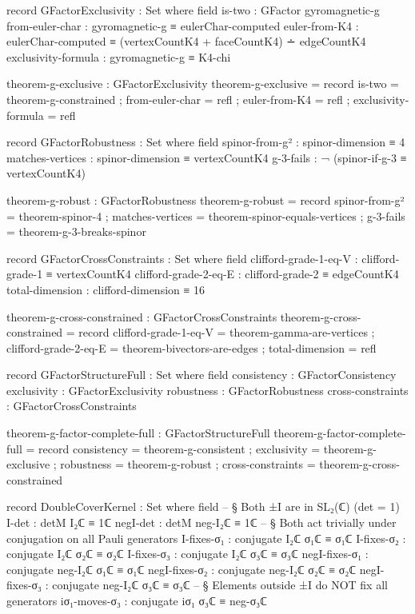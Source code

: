 \documentclass[11pt,a4paper]{book}
\begin{document}
\begin{code}
record GFactorExclusivity : Set where
  field
    is-two              : GFactor gyromagnetic-g
    from-euler-char     : gyromagnetic-g ≡ eulerChar-computed
    euler-from-K4       : eulerChar-computed ≡ (vertexCountK4 + faceCountK4) ∸ edgeCountK4
    exclusivity-formula : gyromagnetic-g ≡ K4-chi

theorem-g-exclusive : GFactorExclusivity
theorem-g-exclusive = record
  { is-two = theorem-g-constrained
  ; from-euler-char = refl
  ; euler-from-K4 = refl
  ; exclusivity-formula = refl
  }

record GFactorRobustness : Set where
  field
    spinor-from-g²   : spinor-dimension ≡ 4
    matches-vertices : spinor-dimension ≡ vertexCountK4
    g-3-fails        : ¬ (spinor-if-g-3 ≡ vertexCountK4)

theorem-g-robust : GFactorRobustness
theorem-g-robust = record
  { spinor-from-g² = theorem-spinor-4
  ; matches-vertices = theorem-spinor-equals-vertices
  ; g-3-fails = theorem-g-3-breaks-spinor
  }

record GFactorCrossConstraints : Set where
  field
    clifford-grade-1-eq-V : clifford-grade-1 ≡ vertexCountK4
    clifford-grade-2-eq-E : clifford-grade-2 ≡ edgeCountK4
    total-dimension       : clifford-dimension ≡ 16

theorem-g-cross-constrained : GFactorCrossConstraints
theorem-g-cross-constrained = record
  { clifford-grade-1-eq-V = theorem-gamma-are-vertices
  ; clifford-grade-2-eq-E = theorem-bivectors-are-edges
  ; total-dimension = refl
  }

record GFactorStructureFull : Set where
  field
    consistency      : GFactorConsistency
    exclusivity      : GFactorExclusivity
    robustness       : GFactorRobustness
    cross-constraints : GFactorCrossConstraints

theorem-g-factor-complete-full : GFactorStructureFull
theorem-g-factor-complete-full = record
  { consistency = theorem-g-consistent
  ; exclusivity = theorem-g-exclusive
  ; robustness = theorem-g-robust
  ; cross-constraints = theorem-g-cross-constrained
  }

record DoubleCoverKernel : Set where
  field
    -- § Both ±I are in SL₂(ℂ) (det = 1)
    I-det    : detM I₂ℂ     ≡ 1ℂ
    negI-det : detM neg-I₂ℂ ≡ 1ℂ
    -- § Both act trivially under conjugation on all Pauli generators
    I-fixes-σ₁    : conjugate I₂ℂ     σ₁ℂ ≡ σ₁ℂ
    I-fixes-σ₂    : conjugate I₂ℂ     σ₂ℂ ≡ σ₂ℂ
    I-fixes-σ₃    : conjugate I₂ℂ     σ₃ℂ ≡ σ₃ℂ
    negI-fixes-σ₁ : conjugate neg-I₂ℂ σ₁ℂ ≡ σ₁ℂ
    negI-fixes-σ₂ : conjugate neg-I₂ℂ σ₂ℂ ≡ σ₂ℂ
    negI-fixes-σ₃ : conjugate neg-I₂ℂ σ₃ℂ ≡ σ₃ℂ
    -- § Elements outside ±I do NOT fix all generators
    iσ₁-moves-σ₃  : conjugate iσ₁ σ₃ℂ ≡ neg-σ₃ℂ


\end{code}
\end{document}
